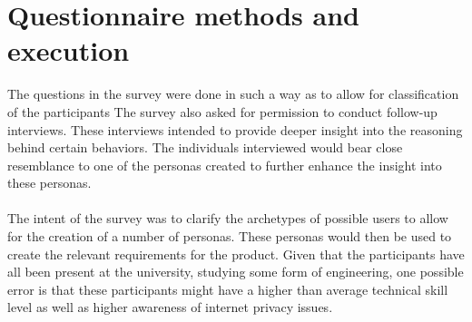 \section{Questionnaire methods and execution}
The questions in the survey were done in such a way as to allow for classification of the participants 
The survey also asked for permission to conduct follow-up interviews. These interviews intended to provide deeper insight into the reasoning behind certain behaviors. The individuals interviewed would bear close resemblance to one of the personas created to further enhance the insight into these personas.\\\\
\noindent
The intent of the survey was to clarify the archetypes of possible users to allow for the creation of a number of personas. These personas would then be used to create the relevant requirements for the product.
\noindent
Given that the participants have all been present at the university, studying some form of engineering, one possible error is that these participants might have a higher than average technical skill level as well as higher awareness of internet privacy issues.